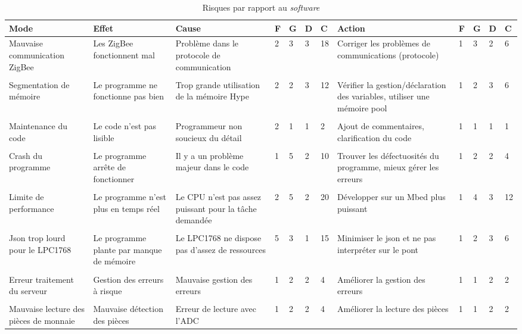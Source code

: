 \begin{table}[h]
	\centering
	\caption{Risques par rapport au \emph{software}}
	\begin{tabular}{P{2cm}P{2cm}P{2cm}llllP{2cm}llll}
		\hline
		\bf Mode & \bf Effet & \bf Cause & \bf F & \bf G & \bf D & \bf C & \bf Action & \bf F & \bf G & \bf D & \bf C  \\
		\hline
		\hline
		Mauvaise communication ZigBee & Les ZigBee fonctionnent mal & Problème dans le protocole de communication & 2 & 3 & 3 & 18 & Corriger les problèmes de communications (protocole) & 1 & 3 & 2 & 6 \\\\ 
		Segmentation de mémoire & Le programme ne fonctionne pas bien & Trop grande utilisation de la mémoire Hype & 2 & 2 & 3 & 12 & Vérifier la gestion/déclaration des variables, utiliser une mémoire pool & 1 & 2 & 3 & 6 \\\\
		Maintenance du code & Le code n'est pas lisible & Programmeur non soucieux du détail & 2& 1 & 1 & 2 & Ajout de commentaires, clarification du code & 1 & 1 & 1 & 1 \\\\
		Crash du programme & Le programme arrête de fonctionner & Il y a un problème majeur dans le code & 1 & 5 & 2 & 10 & Trouver les défectuosités du programme, mieux gérer les erreurs & 1 & 2 & 2 & 4 \\\\
		Limite de performance & Le programme n'est plus en temps réel & Le CPU n'est pas assez puissant pour la tâche demandée & 2 & 5 & 2 & 20 & Développer sur un Mbed plus puissant & 1 & 4 & 3 & 12 \\\\
		Json trop lourd pour le LPC1768 & Le programme plante par manque de mémoire & Le LPC1768 ne dispose pas d'assez de ressources & 5 & 3 & 1 & 15 & Minimiser le json et ne pas interpréter sur le pont & 1 & 2 & 3 & 6 \\\\
		Erreur traitement du serveur & Gestion des erreurs à risque & Mauvaise gestion des erreurs & 1 & 2 & 2 & 4 & Améliorer la gestion des erreurs & 1 & 1 & 2 & 2 \\\\
		Mauvaise lecture des pièces de monnaie & Mauvaise détection des pièces & Erreur de lecture avec l'ADC & 1 & 2 & 2 & 4 & Améliorer la lecture des pièces & 1 & 1 & 2 & 2 \\
		\hline
	\end{tabular}
\end{table}
